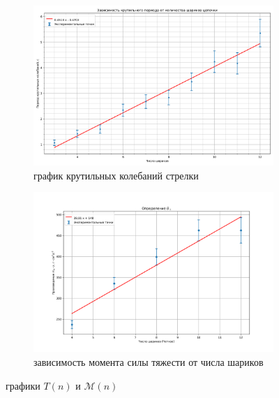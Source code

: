 \documentclass[a4paper, 12pt]{article}
\begin{document}
\begin{enumerate}
\begin{figure}[htbp]
        \begin{subfigure}{0.8\textwidth}
            \centering
            \includegraphics[width=\linewidth]{period.png}
            \caption{график крутильных колебаний стрелки}
            \label{горизонтальная составляющая}
        \end{subfigure}
        \hfill
        \begin{subfigure}{0.8\textwidth}
            \centering
            \includegraphics[width=\linewidth]{vertical.png}
            \caption{зависимость момента силы тяжести от числа шариков}
            \label{вертикальная составляющая}
        \end{subfigure}
        \caption{графики $T(n)$ и $\mathcal{M}(n)$}
        \label{графики моментов и периодов}
    \end{figure}
\end{enumerate}
\end{document}
